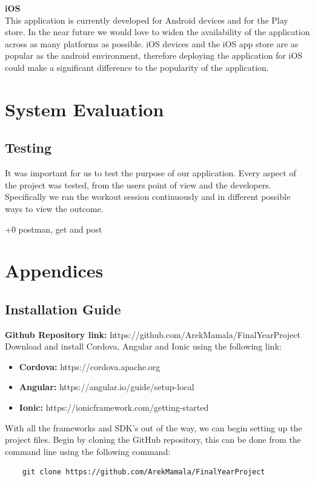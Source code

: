 \documentclass[a4paper,12pt]{report}
\begin{document}
\textbf{iOS}\\
This application is currently developed for  Android devices and for the Play store. In the near future we would love to widen the availability of the application across as many platforms as possible.
iOS devices and the iOS app store are as popular as the android environment, therefore deploying the application for iOS could make a significant difference to the popularity of the application.
\chapter{System Evaluation}
\section{Testing}
It was important for us to test the purpose of our application. Every aspect of the project was tested, from the users point of view and the developers. Specifically we ran the workout session continuously and in different possible ways to view the outcome.

+0
postman, get and post

\chapter{Appendices}

\section{Installation Guide}
\textbf{Github Repository link:} https://github.com/ArekMamala/FinalYearProject \\

Download and install Cordova, Angular and Ionic using the following
link:
\begin{itemize}
    \item \textbf{Cordova: } https://cordova.apache.org
    \item \textbf{Angular: } https://angular.io/guide/setup-local
    \item \textbf{Ionic: } https://ionicframework.com/getting-started\\
\end{itemize}

With all the frameworks and SDK's out of the way, we can begin setting up
the project files. 
Begin by cloning the GitHub repository, this can be done from the command line using the following command:
\begin{lstlisting}
    git clone https://github.com/ArekMamala/FinalYearProject
\end{lstlisting}{}
\end{document}
